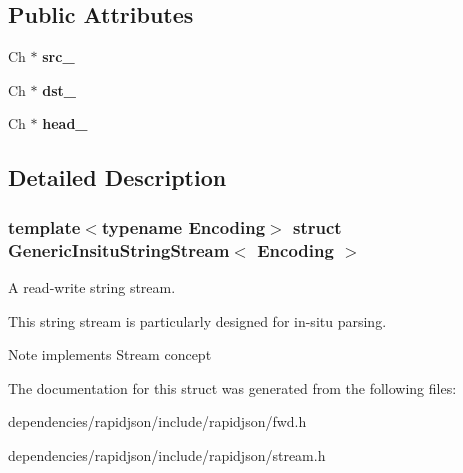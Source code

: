 \subsection*{Public Attributes}
\begin{DoxyCompactItemize}
\item 
\mbox{\label{struct_generic_insitu_string_stream_af3cc551dd07fcca39db84459f4d4e718}} 
Ch $\ast$ {\bfseries src\+\_\+}
\item 
\mbox{\label{struct_generic_insitu_string_stream_ab0e7a73638a7a8db81aa9b26714b0e3b}} 
Ch $\ast$ {\bfseries dst\+\_\+}
\item 
\mbox{\label{struct_generic_insitu_string_stream_af5a7116bdd9bfde5141c298a5b7566b0}} 
Ch $\ast$ {\bfseries head\+\_\+}
\end{DoxyCompactItemize}


\subsection{Detailed Description}
\subsubsection*{template$<$typename Encoding$>$\newline
struct Generic\+Insitu\+String\+Stream$<$ Encoding $>$}

A read-\/write string stream. 

This string stream is particularly designed for in-\/situ parsing. \begin{DoxyNote}{Note}
implements Stream concept 
\end{DoxyNote}


The documentation for this struct was generated from the following files\+:\begin{DoxyCompactItemize}
\item 
dependencies/rapidjson/include/rapidjson/fwd.\+h\item 
dependencies/rapidjson/include/rapidjson/stream.\+h\end{DoxyCompactItemize}
